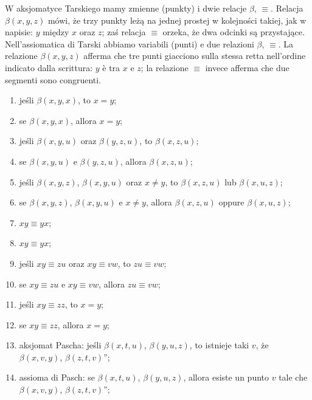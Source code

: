 W aksjomatyce Tarskiego mamy zmienne (punkty) i dwie relacje $\beta$, $\equiv$. %
Relacja $\beta (x, y, z)$ mówi, że trzy punkty leżą na jednej prostej w kolejności takiej, jak w napisie: $y$ między $x$ oraz $z$; zaś relacja $\equiv$ orzeka, że dwa odcinki są przystające. %
Nell'assiomatica di Tarski abbiamo variabili (punti) e due relazioni $\beta$, $\equiv$. %
La relazione $\beta (x, y, z)$ afferma che tre punti giacciono sulla stessa retta nell'ordine indicato dalla scrittura: $y$ è tra $x$ e $z$; la relazione $\equiv$ invece afferma che due segmenti sono congruenti. %
\begin{enumerate}
      \item jeśli $\beta (x, y, x)$, to $x = y$; %
      \item se $\beta (x, y, x)$, allora $x = y$; %
      
      \item jeśli $\beta (x, y, u)$ oraz $\beta (y, z, u)$,  to $\beta (x, z, u)$; %
      \item se $\beta (x, y, u)$ e $\beta (y, z, u)$, allora $\beta (x, z, u)$; %
      
      \item jeśli $\beta (x, y, z)$, $\beta (x, y, u)$ oraz $x \neq y$, to $\beta (x, z, u)$ lub $\beta (x, u, z)$; %
      \item se $\beta (x, y, z)$, $\beta (x, y, u)$ e $x \neq y$, allora $\beta (x, z, u)$ oppure $\beta (x, u, z)$; %
      
      \item $xy \equiv yx$; %
      \item $xy \equiv yx$; %

      \item jeśli $xy \equiv zu$ oraz $xy \equiv vw$, to $zu \equiv vw$; %
      \item se $xy \equiv zu$ e $xy \equiv vw$, allora $zu \equiv vw$; %

      \item jeśli $xy \equiv zz$, to $x = y$; %
      \item se $xy \equiv zz$, allora $x = y$; %

      \item aksjomat Pascha: jeśli $\beta (x, t, u)$, $\beta (y, u, z)$, to istnieje taki $v$, że $\beta (x, v, y)$, $\beta(z, t, v)$''; %
      \item assioma di Pasch: se $\beta (x, t, u)$, $\beta (y, u, z)$, allora esiste un punto $v$ tale che $\beta (x, v, y)$, $\beta(z, t, v)$''; %


\end{enumerate}
